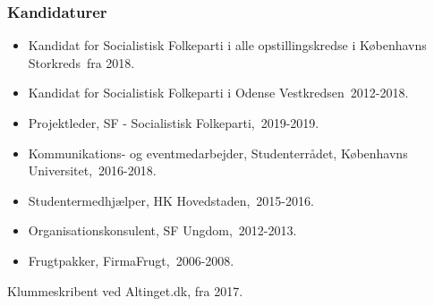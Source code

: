 \documentclass[11pt, a4paper]{awesome-cv}
\begin{document}
\begin{cvletter}
\subsubsection*{Kandidaturer}
\begin{itemize}
\item Kandidat for Socialistisk Folkeparti i alle opstillingskredse i Københavns Storkreds fra 2018.
\item Kandidat for Socialistisk Folkeparti i Odense Vestkredsen 2012-2018.
\end{itemize}
\begin{itemize}
\item Projektleder, SF - Socialistisk Folkeparti, 2019-2019.
\item Kommunikations- og eventmedarbejder, Studenterrådet, Københavns Universitet, 2016-2018.
\item Studentermedhjælper, HK Hovedstaden, 2015-2016.
\item Organisationskonsulent, SF Ungdom, 2012-2013.
\item Frugtpakker, FirmaFrugt, 2006-2008.
\end{itemize}
Klummeskribent ved Altinget.dk, fra 2017.

\end{cvletter}
\end{document}
